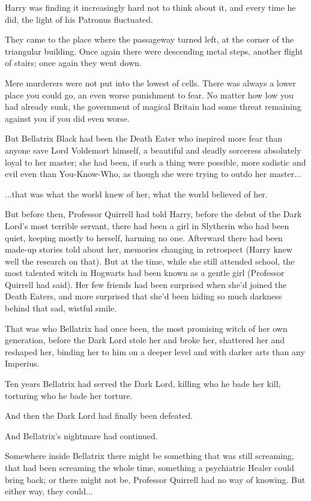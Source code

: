 Harry was finding it increasingly hard not to think about it, and every
time he did, the light of his Patronus fluctuated.

They came to the place where the passageway turned left, at the corner
of the triangular building. Once again there were descending metal
steps, another flight of stairs; once again they went down.

Mere murderers were not put into the lowest of cells. There was always a
lower place you could go, an even worse punishment to fear. No matter
how low you had already sunk, the government of magical Britain had some
threat remaining against you if you did even worse.

But Bellatrix Black had been the Death Eater who inspired more fear than
anyone save Lord Voldemort himself, a beautiful and deadly sorceress
absolutely loyal to her master; she had been, if such a thing were
possible, more sadistic and evil even than You-Know-Who, as though she
were trying to outdo her master...

...that was what the world knew of her, what the world believed of
her.

But before then, Professor Quirrell had told Harry, before the debut of
the Dark Lord's most terrible servant, there had been a girl in
Slytherin who had been quiet, keeping mostly to herself, harming no one.
Afterward there had been made-up stories told about her, memories
changing in retrospect (Harry knew well the research on that). But at
the time, while she still attended school, the most talented witch in
Hogwarts had been known as a gentle girl (Professor Quirrell had said).
Her few friends had been surprised when she'd joined the Death Eaters,
and more surprised that she'd been hiding so much darkness behind that
sad, wistful smile.

That was who Bellatrix had once been, the most promising witch of her
own generation, before the Dark Lord stole her and broke her, shattered
her and reshaped her, binding her to him on a deeper level and with
darker arts than any Imperius.

Ten years Bellatrix had served the Dark Lord, killing who he bade her
kill, torturing who he bade her torture.

And then the Dark Lord had finally been defeated.

And Bellatrix's nightmare had continued.

Somewhere inside Bellatrix there might be something that was still
screaming, that had been screaming the whole time, something a
psychiatric Healer could bring back; or there might not be, Professor
Quirrell had no way of knowing. But either way, they could...

